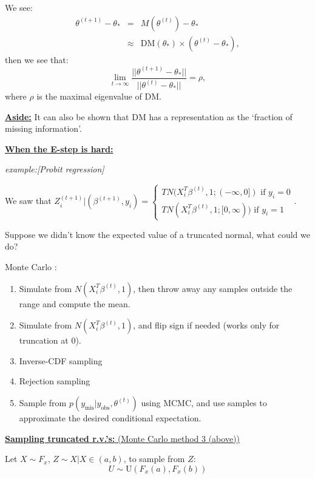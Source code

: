 \documentclass[12pt,letterpaper]{article}
\begin{document}
We see:
\begin{eqnarray}
 \theta^{(t+1)}-\theta_* &=& M(\theta^{(t)})-\theta_*\nonumber\\
&\approx&\text{DM}(\theta_*)\times(\theta^{(t)}-\theta_*),\nonumber
\end{eqnarray}
then we see that:
\[\lim_{t\rightarrow \infty}\frac{||\theta^{(t+1)}-\theta_*||}{||\theta^{(t)}-\theta_*||} = \rho,\]
where $\rho$ is the maximal eigenvalue of DM.

\underline{\textbf{Aside:}} It can also be shown that DM has a representation as the \lq{}fraction of missing information\rq{}.

\vspace{0.2in}
\underline{\textbf{When the E-step is hard:}} 

\textit{example:[Probit regression]}

 We saw that $Z^{(t+1)}_i |(\beta^{(t+1)},y_i) = \left\{\begin{array}{c}TN(X_i^T\beta^{(t)},1;(-\infty,0])\text{ if }y_i=0 \\TN(X_i^T\beta^{(t)},1;[0,\infty)) \text{ if }y_i=1\end{array}\right.$.  
 
\vspace{0.1in}
 Suppose we didn't know the expected value of a truncated normal, what could we do?
 
 \vspace{0.1in}
 Monte Carlo :
 \begin{enumerate}
 \item Simulate from $N(X_i^T\beta^{(t)},1)$, then throw away any samples outside the range and compute the mean.
 \item Simulate from $N(X_i^T\beta^{(t)},1)$, and flip sign if needed (works only for truncation at 0).
 \item Inverse-CDF sampling
 \item Rejection sampling
 \item Sample from $p(y_{\text{mis}}|y_{\text{obs}},\theta^{(t)})$ using MCMC, and use samples to approximate the desired conditional expectation.
 \end{enumerate}
 
 \vspace{0.2in}
 \underline{\textbf{Sampling truncated r.v.'s: }(Monte Carlo method 3 (above))}
 
 \vspace{0.1in}
 Let $X\sim F_x$, $Z\sim X|X\in (a,b)$, to sample from $Z$:
 \[U \sim \mathrm{U}(F_x(a),F_x(b))\]
 
\end{document}
